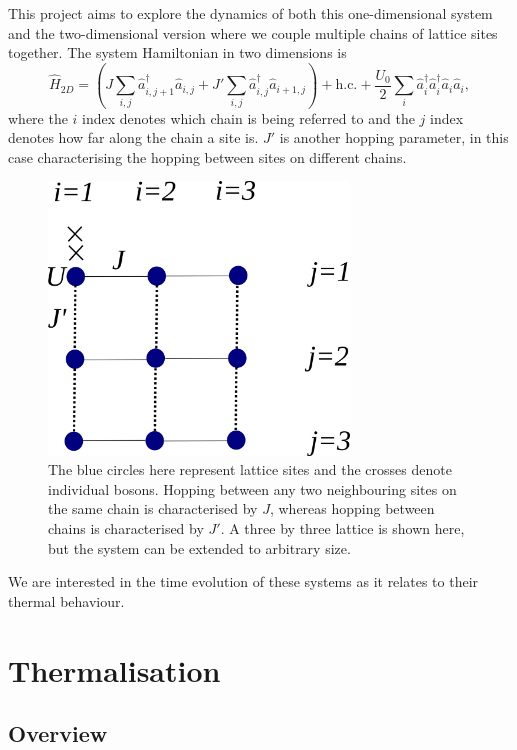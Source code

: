 \documentclass[a4paper, 10pt]{article}
\theoremstyle{plain}
\begin{document}
This project aims to explore the dynamics of both this one-dimensional system
and the two-dimensional version where we couple multiple chains of lattice
sites together. The system Hamiltonian in two dimensions is
\begin{equation}
    \hat{H}_{2D}
    =
    \left (
        J \sum_{i,j}{\hat{a}^{\dagger}_{i,j+1} \hat{a}_{i,j}} +
        J'\sum_{i,j}{\hat{a}^{\dagger}_{i,j} \hat{a}_{i+1,j}}
    \right) +
    \text{h.c.} +
    \frac{U_{0}}{2}
    \sum_{i}{\hat{a}^{\dagger}_{i}\hat{a}^{\dagger}_{i} \hat{a}_{i}\hat{a}_{i}},
\end{equation}
where the $i$ index denotes which chain is being referred to and the $j$ index
denotes how far along the chain a site is. $J'$ is another hopping parameter,
in this case characterising the hopping between sites on different chains.
\begin{figure}[H]
    \begin{center}
        \includegraphics[width=8cm]{lattice_pic}
    \end{center}
    \caption{The blue circles here represent lattice sites and the crosses
             denote individual bosons. Hopping between any two neighbouring
             sites on the same chain is characterised by $J$, whereas hopping
             between chains is characterised by $J'$. A three by three lattice
             is shown here, but the system can be extended to arbitrary size.
            }
\end{figure}
We are interested in the time evolution of these systems as it relates to their
thermal behaviour.


\section{Thermalisation}

\subsection{Overview}
\end{document}

